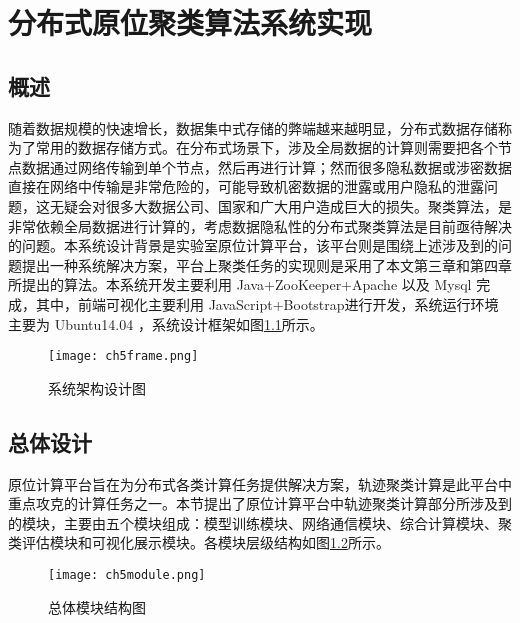 \chapter{分布式原位聚类算法系统实现}

\section{概述}
随着数据规模的快速增长，数据集中式存储的弊端越来越明显，分布式数据存储称为了常用的数据存储方式。在分布式场景下，涉及全局数据的计算则需要把各个节点数据通过网络传输到单个节点，然后再进行计算；然而很多隐私数据或涉密数据直接在网络中传输是非常危险的，可能导致机密数据的泄露或用户隐私的泄露问题，这无疑会对很多大数据公司、国家和广大用户造成巨大的损失。聚类算法，是非常依赖全局数据进行计算的，考虑数据隐私性的分布式聚类算法是目前亟待解决的问题。本系统设计背景是实验室原位计算平台，该平台则是围绕上述涉及到的问题提出一种系统解决方案，平台上聚类任务的实现则是采用了本文第三章和第四章所提出的算法。本系统开发主要利用 Java+ZooKeeper+Apache 以及 Mysql 完成，其中，前端可视化主要利用 JavaScript+Bootstrap进行开发，系统运行环境主要为 Ubuntu14.04 ，系统设计框架如图\ref{ch5frame}所示。
\begin{figure}[h]
	\texttt{[image: ch5frame.png]}
	\caption{系统架构设计图}
	\label{ch5frame}
\end{figure}

\section{总体设计}
原位计算平台旨在为分布式各类计算任务提供解决方案，轨迹聚类计算是此平台中重点攻克的计算任务之一。本节提出了原位计算平台中轨迹聚类计算部分所涉及到的模块，主要由五个模块组成：模型训练模块、网络通信模块、综合计算模块、聚类评估模块和可视化展示模块。各模块层级结构如图\ref{ch5module}所示。
\begin{figure}[h]
	\texttt{[image: ch5module.png]}
	\caption{总体模块结构图}
	\label{ch5module}
\end{figure}

